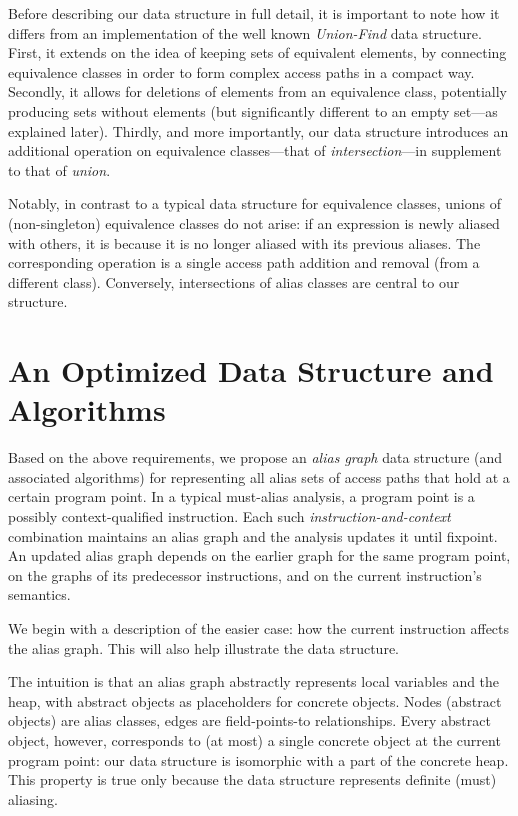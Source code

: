 Before describing our data structure in full detail, it is important to note how it differs from an implementation of the well known \emph{Union-Find} data structure. First, it extends on the idea of keeping sets of equivalent elements, by connecting equivalence classes in order to form complex access paths in a compact way. Secondly, it allows for deletions of elements from an equivalence class, potentially producing sets without elements (but significantly different to an empty set---as explained later). Thirdly, and more importantly, our data structure introduces an additional operation on equivalence classes---that of \emph{intersection}---in supplement to that of \emph{union}.

Notably, in contrast to a typical data structure for equivalence classes, unions of (non-singleton) equivalence classes do not arise: if an expression is newly aliased with others, it is because it is no longer aliased with its previous aliases. The corresponding operation is a single access path addition and removal (from a different class). Conversely, intersections of alias classes are central to our structure.


\section{An Optimized Data Structure and Algorithms}

Based on the above requirements, we propose an \emph{alias graph} data structure (and associated algorithms) for representing all alias sets of access paths that hold at a certain program point. In a typical must-alias analysis, a program point is a possibly context-qualified instruction. Each such \emph{instruction-and-context} combination maintains an alias graph and the analysis updates it until fixpoint. An updated alias graph depends on the earlier graph for the same program point, on the graphs of its predecessor instructions, and on the current instruction's semantics.

We begin with a description of the easier case: how the current instruction affects the alias graph. This will also help illustrate the data structure.

The intuition is that an alias graph abstractly represents local variables and the heap, with abstract objects as placeholders for concrete objects. Nodes (abstract objects) are alias classes, edges are field-points-to relationships. Every abstract object, however, corresponds to (at most) a single concrete object at the current program point: our data structure is isomorphic with a part of the concrete heap. This property is true only because the data structure represents definite (must) aliasing.

